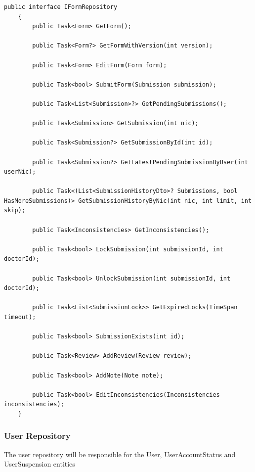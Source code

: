 \begin{lstlisting}[style=sharpc]
	public interface IFormRepository
	{
		public Task<Form> GetForm();
		
		public Task<Form?> GetFormWithVersion(int version);
		
		public Task<Form> EditForm(Form form);
		
		public Task<bool> SubmitForm(Submission submission);
		
		public Task<List<Submission>?> GetPendingSubmissions();
		
		public Task<Submission> GetSubmission(int nic);
		
		public Task<Submission?> GetSubmissionById(int id);
		
		public Task<Submission?> GetLatestPendingSubmissionByUser(int userNic);
		
		public Task<(List<SubmissionHistoryDto>? Submissions, bool HasMoreSubmissions)> GetSubmissionHistoryByNic(int nic, int limit, int skip);
		
		public Task<Inconsistencies> GetInconsistencies();
		
		public Task<bool> LockSubmission(int submissionId, int doctorId);
		
		public Task<bool> UnlockSubmission(int submissionId, int doctorId);
		
		public Task<List<SubmissionLock>> GetExpiredLocks(TimeSpan timeout);
		
		public Task<bool> SubmissionExists(int id);
		
		public Task<Review> AddReview(Review review);
		
		public Task<bool> AddNote(Note note);
		
		public Task<bool> EditInconsistencies(Inconsistencies inconsistencies);
	}
\end{lstlisting}

\subsubsection{User Repository}

The user repository will be responsible for the User, UserAccountStatus and UserSuspension entities

